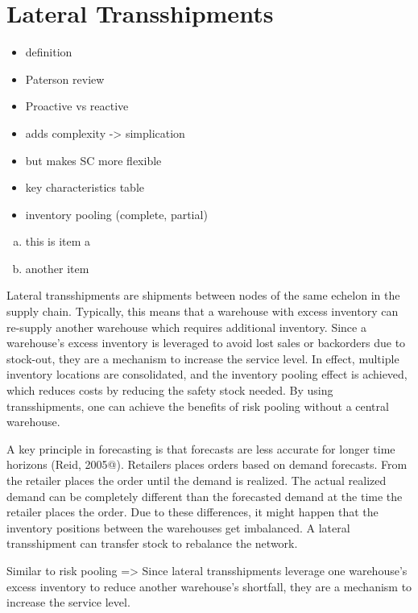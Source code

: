 \documentclass[../../main.tex]{subfiles}
\begin{document}

\section{Lateral Transshipments}

\begin{itemize}
\item definition
\item Paterson review
\item Proactive vs reactive
\item adds complexity -> simplication
\item but makes SC more flexible
\item key characteristics table
\item inventory pooling (complete, partial)
\end{itemize}

\begin{enumerate}[a)]
\item this is item a
\item another item
\end{enumerate}

Lateral transshipments are shipments between nodes of the same echelon in the supply chain. Typically, this means that a warehouse with excess inventory can re-supply another warehouse which requires additional inventory. Since a warehouse's excess inventory is leveraged to avoid lost sales or backorders due to stock-out, they are a mechanism to increase the service level. In effect, multiple inventory locations are consolidated, and the inventory pooling effect is achieved, which reduces costs by reducing the safety stock needed. By using transshipments, one can achieve the benefits of risk pooling without a central warehouse. 

A key principle in forecasting is that forecasts are less accurate for longer time horizons (Reid, 2005@). Retailers places orders based on demand forecasts. From the retailer places the order until the demand is realized. The actual realized demand can be completely different than the forecasted demand at the time the retailer places the order. Due to these differences, it might happen that the inventory positions between the warehouses get imbalanced. A lateral transshipment can transfer stock to rebalance the network. 

Similar to risk pooling => Since lateral transshipments leverage one warehouse's excess inventory to reduce another warehouse's shortfall, they are a mechanism to increase the service level.
\end{document}
